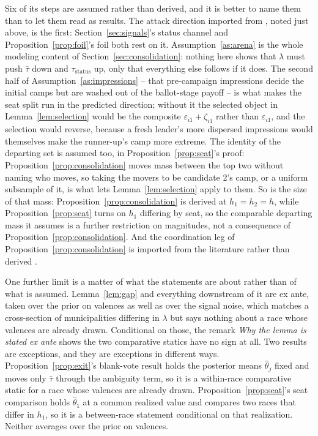 \documentclass[11pt]{article}
\theoremstyle{definition}
\theoremstyle{remark}
\begin{document}
Six of its steps are assumed rather than derived, and it is better to name
them than to let them read as results. The attack direction imported from
\citet{nakaguma2025}, noted just above, is the first: Section~\ref{sec:signals}'s
status channel and Proposition~\ref{prop:foil}'s foil both rest on it.
Assumption~\ref{as:arena} is the whole
modeling content of Section~\ref{sec:consolidation}: nothing here shows that
$\lambda$ must push $\bar\tau$ down and $\tau_{\mathrm{status}}$ up, only
that everything else follows if it does. The second half of
Assumption~\ref{as:impressions} -- that pre-campaign impressions decide the
initial camps but are washed out of the ballot-stage payoff -- is what makes
the seat split run in the predicted direction; without it the selected object
in Lemma~\ref{lem:selection} would be the composite
$\varepsilon_{i1} + \zeta_{i1}$ rather than $\varepsilon_{i1}$, and the
selection would reverse, because a fresh leader's more dispersed impressions
would themselves make the runner-up's camp more extreme. The identity of the
departing set is assumed too, in Proposition~\ref{prop:seat}'s proof:
Proposition~\ref{prop:consolidation} moves mass between the top two without
naming who moves, so taking the movers to be candidate 2's camp, or a uniform
subsample of it, is what lets Lemma~\ref{lem:selection} apply to them. So is
the size of that mass: Proposition~\ref{prop:consolidation} is derived at
$h_1 = h_2 = h$, while Proposition~\ref{prop:seat} turns on $h_1$ differing
by seat, so the comparable departing mass it assumes is a further
restriction on magnitudes, not a consequence of
Proposition~\ref{prop:consolidation}. And the
coordination leg of Proposition~\ref{prop:consolidation} is imported from the
literature rather than derived \citep{myerson1993,fey1997,cox1997}.

One further limit is a matter of what the statements are about rather than of
what is assumed. Lemma~\ref{lem:gap} and everything downstream of it are ex
ante, taken over the prior on valences as well as over the signal noise, which
matches a cross-section of municipalities differing in $\lambda$ but says
nothing about a race whose valences are already drawn. Conditional on those,
the remark \emph{Why the lemma is stated ex ante} shows the two comparative
statics have no sign at all. Two results are exceptions, and they are exceptions in different
ways. Proposition~\ref{prop:exit}'s blank-vote result holds the posterior means
$\hat\theta_j$ fixed and moves only $\bar\tau$ through the ambiguity term, so it
is a within-race comparative static for a race whose valences are already drawn.
Proposition~\ref{prop:seat}'s seat comparison holds $\hat\theta_1$ at a common
realized value and compares two races that differ in $h_1$, so it is a
between-race statement conditional on that realization. Neither averages over
the prior on valences.
\end{document}
